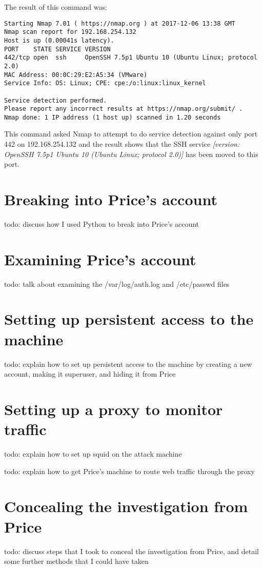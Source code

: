 \documentclass[12pt]{report}
\begin{document}
The result of this command was:
\begin{Verbatim}
Starting Nmap 7.01 ( https://nmap.org ) at 2017-12-06 13:38 GMT
Nmap scan report for 192.168.254.132
Host is up (0.00041s latency).
PORT    STATE SERVICE VERSION
442/tcp open  ssh     OpenSSH 7.5p1 Ubuntu 10 (Ubuntu Linux; protocol 2.0)
MAC Address: 00:0C:29:E2:A5:34 (VMware)
Service Info: OS: Linux; CPE: cpe:/o:linux:linux_kernel

Service detection performed.
Please report any incorrect results at https://nmap.org/submit/ .
Nmap done: 1 IP address (1 host up) scanned in 1.20 seconds
\end{Verbatim}

This command asked Nmap to attempt to do service detection against only port 442 on 192.168.254.132 and the result shows that the SSH service \textit{[version: OpenSSH 7.5p1 Ubuntu 10 (Ubuntu Linux; protocol 2.0)]} has been moved to this port.


\section{Breaking into Price's account}
todo: discuss how I used Python to break into Price's account

\section{Examining Price's account}
todo: talk about examining the /var/log/auth.log and /etc/passwd files

\section{Setting up persistent access to the machine}
todo: explain how to set up persistent access to the machine by creating a new account, making it superuser, and hiding it from Price

\section{Setting up a proxy to monitor traffic}
todo: explain how to set up squid on the attack machine

todo: explain how to get Price's machine to route web traffic through the proxy

\section{Concealing the investigation from Price}
todo: discuss steps that I took to conceal the investigation from Price, and detail some further methods that I could have taken
\end{document}
